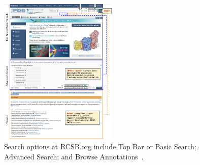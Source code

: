 \documentclass[]{final_report}
\begin{document}
\begin{figure}[ht]
    \centering
    \includegraphics[width=0.5\textwidth]{PDB Site.png}
    \caption{\label{fig:PDB}Search options at RCSB.org include Top Bar or Basic Search; Advanced Search; and Browse Annotations~\cite{burley1_rcsb_2022}.}
\end{figure}
\end{document}
